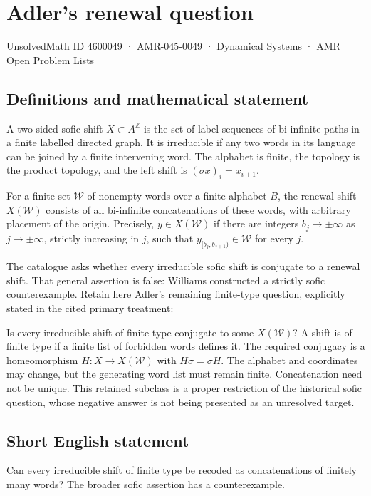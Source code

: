 \documentclass[11pt,a4paper]{article}
\begin{document}
\section*{Adler's renewal question}\label{4600049}
{\small UnsolvedMath ID 4600049 · AMR-045-0049 · Dynamical Systems · AMR Open Problem Lists}
\subsection{Definitions and mathematical statement}
A two-sided sofic shift $X\subset A^{\mathbb Z}$ is the set of
label sequences of bi-infinite paths in a finite labelled
directed graph. It is irreducible if any two words in its
language can be joined by a finite intervening word.
The alphabet is finite, the topology is the product topology,
and the left shift is $(\sigma x)_i=x_{i+1}$.

For a finite set $\mathcal W$ of nonempty words over a finite
alphabet $B$, the renewal shift $X(\mathcal W)$ consists of
all bi-infinite concatenations of these words, with arbitrary
placement of the origin. Precisely, $y\in X(\mathcal W)$ if
there are integers $b_j\to\pm\infty$ as $j\to\pm\infty$,
strictly increasing in $j$, such that
$y_{[b_j,b_{j+1})}\in\mathcal W$ for every $j$.

The catalogue asks whether every irreducible sofic shift is
conjugate to a renewal shift. That general assertion is false:
Williams constructed a strictly sofic counterexample. Retain
here Adler's remaining finite-type question, explicitly stated
in the cited primary treatment:

Is every irreducible shift of finite type conjugate to some
$X(\mathcal W)$? A shift is of finite type if a finite list
of forbidden words defines it. The required conjugacy is a
homeomorphism $H:X\to X(\mathcal W)$ with $H\sigma=\sigma H$.
The alphabet and coordinates may change, but the generating
word list must remain finite. Concatenation need not be unique.
This retained subclass is a proper restriction of the
historical sofic question, whose negative answer is not being
presented as an unresolved target.
\subsection{Short English statement}
Can every irreducible shift of finite type be recoded as concatenations of finitely many words? The broader sofic assertion has a counterexample.
\end{document}
